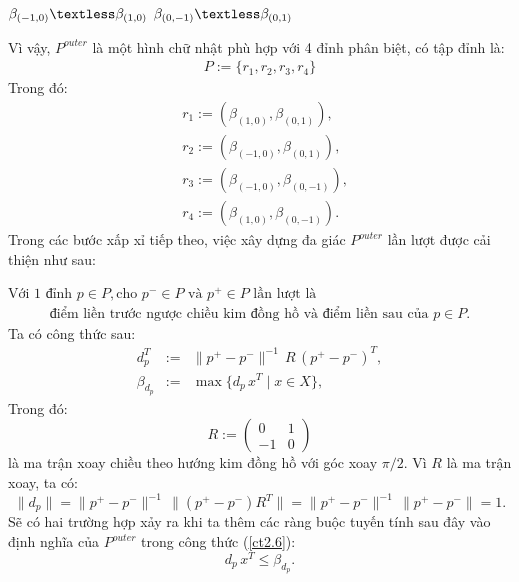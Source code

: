 \documentclass[12pt,a4paper,openany,oneside]{report}
\begin{document}
\begin{center}
	$\beta_{(-1, 0)} \textless \beta_{(1, 0)}$  $\beta_{(0, -1)} \textless \beta_{(0, 1)}$
\end{center}
Vì vậy, ${P}^{outer}$ là một hình chữ nhật phù hợp với 4 đỉnh phân biệt, có tập đỉnh là:
\begin{align}\label{ct2.10}
	P := \{r_1, r_2, r_3, r_4\}
\end{align}
Trong đó:
\begin{equation}\label{ct2.11}
	\begin{aligned}
		& r_1:=\left(\beta_{(1,0)}, \beta_{(0,1)}\right), \\
		& r_2:=\left(\beta_{(-1,0)}, \beta_{(0,1)}\right), \\
		& r_3:=\left(\beta_{(-1,0)}, \beta_{(0,-1)}\right), \\
		& r_4:=\left(\beta_{(1,0)}, \beta_{(0,-1)}\right) .
	\end{aligned}
\end{equation}
Trong các bước xấp xỉ tiếp theo, việc xây dựng đa giác ${P}^{outer}$ lần lượt được cải thiện như sau:

$\text{Với 1 đỉnh }p \in P, \text{cho } p^{-} \in P \text{ và } p^{+} \in P \text{ lần lượt là}$
\begin{align} \label{ct2.12}
\text {điểm liền trước ngược chiều kim đồng hồ và điểm liền sau của } p \in P.
\end{align}
Ta có công thức sau:
\begin{equation}\label{ct2.13}
	\begin{array}{lcl}
		d_{p}^T &:=& \|p^+ - p^-\|^{-1}\, R \, (p^+ - p^-)^T, \\
		\beta_{d_{p}} &:=& \max\{d_{p}\, x^T \mid x \in X\},
	\end{array}
\end{equation}
Trong đó:
\begin{equation}\label{ct2.14}
	R := \begin{pmatrix}
		0 & 1 \\
		-1 & 0
	\end{pmatrix}
\end{equation}
là ma trận xoay chiều theo hướng kim đồng hồ với góc xoay $\pi/2$. Vì $R$ là ma trận xoay, ta có:
\begin{equation}\label{ct2.15}
	\|d_{p}\| = \|p^+ - p^-\|^{-1}\, \|(p^+ - p^-) R^T\| = \|p^+ - p^-\|^{-1}\, \|p^+ - p^-\| = 1.
\end{equation}
Sẽ có hai trường hợp xảy ra khi ta thêm các ràng buộc tuyến tính sau đây vào định nghĩa của ${P}^{outer}$ trong công thức (\ref{ct2.6}):
\begin{equation}\label{ct2.16}
	d_p\, x^T \leq \beta_{d_p}.
\end{equation}
\end{document}
